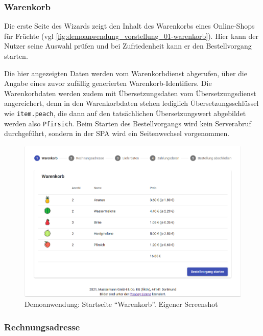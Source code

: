 \subsubsection{Warenkorb}

Die erste Seite des Wizards zeigt den Inhalt des Warenkorbs eines Online-Shops für Früchte (vgl \autoref{fig:demoanwendung_vorstellung_01-warenkorb}). Hier kann der Nutzer seine Auswahl prüfen und bei Zufriedenheit kann er den Bestellvorgang starten.

Die hier angezeigten Daten werden vom Warenkorbdienst abgerufen, über die Angabe eines zuvor zufällig generierten Warenkorb-Identifiers. Die Warenkorbdaten werden zudem mit Übersetzungsdaten vom Übersetzungsdienst angereichert, denn in den Warenkorbdaten stehen lediglich Übersetzungsschlüssel wie \texttt{item.peach}, die dann auf den tatsächlichen Übersetzungswert abgebildet werden also \texttt{Pfirsich}. Beim Starten des Bestellvorgangs wird kein Serverabruf durchgeführt, sondern in der SPA wird ein Seitenwechsel vorgenommen.

\begin{figure}[H]
	\centering
	\includegraphics[width=1.00\linewidth]{img/04_erstellung-poc/demoanwendung_vorstellung_01-warenkorb_more-items.png}
	\caption{Demoanwendung: Startseite \enquote{Warenkorb}. Eigener Screenshot}
	\label{fig:demoanwendung_vorstellung_01-warenkorb}
\end{figure}

\subsubsection{Rechnungsadresse}

